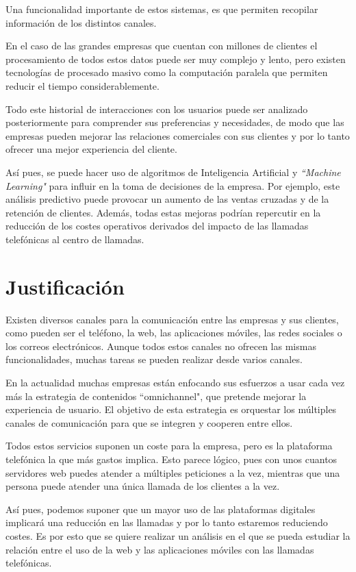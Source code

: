 Una funcionalidad importante de estos sistemas, es que permiten recopilar información de los distintos canales. 

En el caso de las grandes empresas que cuentan con millones de clientes el procesamiento de todos estos datos puede ser muy complejo y lento, pero existen tecnologías de procesado masivo como la computación paralela que permiten reducir el tiempo considerablemente. 

Todo este historial de interacciones con los usuarios puede ser analizado posteriormente para comprender sus preferencias y necesidades, de modo que las empresas pueden mejorar las relaciones comerciales con sus clientes y por lo tanto ofrecer una mejor experiencia del cliente. 

Así pues, se puede hacer uso de algoritmos de Inteligencia Artificial y \textit{``Machine Learning"} para influir en la toma de decisiones de la empresa. Por ejemplo, este análisis predictivo puede provocar un aumento de las ventas cruzadas y de la retención de clientes. Además, todas estas mejoras podrían repercutir en la reducción de los costes operativos derivados del impacto de las llamadas telefónicas al centro de llamadas. 


\section{Justificación}

Existen diversos canales para la comunicación entre las empresas y sus clientes, como pueden ser el teléfono, la web, las aplicaciones móviles, las redes sociales o los correos electrónicos. Aunque todos estos canales no ofrecen las mismas funcionalidades, muchas tareas se pueden realizar desde varios canales.

En la actualidad muchas empresas están enfocando sus esfuerzos a usar cada vez más la estrategia de contenidos ``omnichannel", que pretende mejorar la experiencia de usuario. El objetivo de esta estrategia es orquestar los múltiples canales de comunicación para que se integren y cooperen entre ellos.

Todos estos servicios suponen un coste para la empresa, pero es la plataforma telefónica la que más gastos implica. Esto parece lógico, pues con unos cuantos servidores web puedes atender a múltiples peticiones a la vez, mientras que una persona puede atender una única llamada de los clientes a la vez.

Así pues, podemos suponer que un mayor uso de las plataformas digitales implicará una reducción en las llamadas y por lo tanto estaremos reduciendo costes. Es por esto que se quiere realizar un análisis en el que se pueda estudiar la relación entre el uso de la web y las aplicaciones móviles con las llamadas telefónicas.

